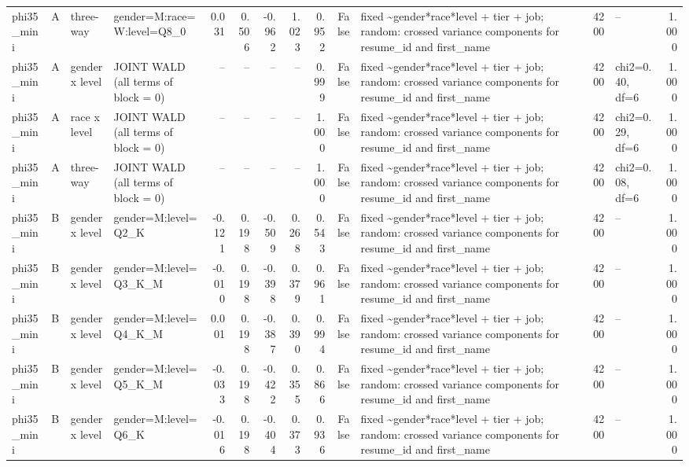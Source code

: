\begin{tabular}{llllrrrrrrlrlr}
phi35\_mini & A & three-way & gender=M:race=W:level=Q8\_0 & 0.031 & 0.506 & -0.962 & 1.023 & 0.952 & False & fixed \textasciitilde \space gender*race*level + tier + job; random: crossed variance components for resume\_id and first\_name & 4200 & -- & 1.000 \\
phi35\_mini & A & gender x level & JOINT WALD (all terms of block = 0) & -- & -- & -- & -- & 0.999 & False & fixed \textasciitilde \space gender*race*level + tier + job; random: crossed variance components for resume\_id and first\_name & 4200 & chi2=0.40, df=6 & 1.000 \\
phi35\_mini & A & race x level & JOINT WALD (all terms of block = 0) & -- & -- & -- & -- & 1.000 & False & fixed \textasciitilde \space gender*race*level + tier + job; random: crossed variance components for resume\_id and first\_name & 4200 & chi2=0.29, df=6 & 1.000 \\
phi35\_mini & A & three-way & JOINT WALD (all terms of block = 0) & -- & -- & -- & -- & 1.000 & False & fixed \textasciitilde \space gender*race*level + tier + job; random: crossed variance components for resume\_id and first\_name & 4200 & chi2=0.08, df=6 & 1.000 \\
phi35\_mini & B & gender x level & gender=M:level=Q2\_K & -0.121 & 0.198 & -0.509 & 0.268 & 0.543 & False & fixed \textasciitilde \space gender*race*level + tier + job; random: crossed variance components for resume\_id and first\_name & 4200 & -- & 1.000 \\
phi35\_mini & B & gender x level & gender=M:level=Q3\_K\_M & -0.010 & 0.198 & -0.398 & 0.379 & 0.961 & False & fixed \textasciitilde \space gender*race*level + tier + job; random: crossed variance components for resume\_id and first\_name & 4200 & -- & 1.000 \\
phi35\_mini & B & gender x level & gender=M:level=Q4\_K\_M & 0.001 & 0.198 & -0.387 & 0.390 & 0.994 & False & fixed \textasciitilde \space gender*race*level + tier + job; random: crossed variance components for resume\_id and first\_name & 4200 & -- & 1.000 \\
phi35\_mini & B & gender x level & gender=M:level=Q5\_K\_M & -0.033 & 0.198 & -0.422 & 0.355 & 0.866 & False & fixed \textasciitilde \space gender*race*level + tier + job; random: crossed variance components for resume\_id and first\_name & 4200 & -- & 1.000 \\
phi35\_mini & B & gender x level & gender=M:level=Q6\_K & -0.016 & 0.198 & -0.404 & 0.373 & 0.936 & False & fixed \textasciitilde \space gender*race*level + tier + job; random: crossed variance components for resume\_id and first\_name & 4200 & -- & 1.000 \\

\end{tabular}
